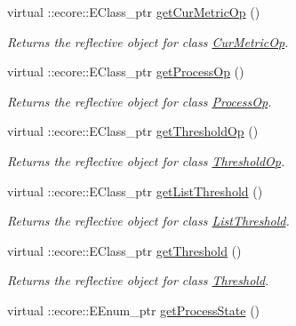 \begin{DoxyCompactItemize}
virtual ::ecore::EClass\_\-ptr \hyperlink{classIMS__Data_1_1IMS__DataPackage_af89695e15fa9f8b666a118d129ec0b7e}{getCurMetricOp} ()
\begin{DoxyCompactList}\small\item\em Returns the reflective object for class \hyperlink{classIMS__Data_1_1CurMetricOp}{CurMetricOp}. \item\end{DoxyCompactList}\item 
virtual ::ecore::EClass\_\-ptr \hyperlink{classIMS__Data_1_1IMS__DataPackage_af66ff319ec0a02a5a7e1c1b18d4a9f8b}{getProcessOp} ()
\begin{DoxyCompactList}\small\item\em Returns the reflective object for class \hyperlink{classIMS__Data_1_1ProcessOp}{ProcessOp}. \item\end{DoxyCompactList}\item 
virtual ::ecore::EClass\_\-ptr \hyperlink{classIMS__Data_1_1IMS__DataPackage_a569cf2cea402678595d96bdb1d66270c}{getThresholdOp} ()
\begin{DoxyCompactList}\small\item\em Returns the reflective object for class \hyperlink{classIMS__Data_1_1ThresholdOp}{ThresholdOp}. \item\end{DoxyCompactList}\item 
virtual ::ecore::EClass\_\-ptr \hyperlink{classIMS__Data_1_1IMS__DataPackage_a73be3b199a1e68564e4706e6ad1d2d10}{getListThreshold} ()
\begin{DoxyCompactList}\small\item\em Returns the reflective object for class \hyperlink{classIMS__Data_1_1ListThreshold}{ListThreshold}. \item\end{DoxyCompactList}\item 
virtual ::ecore::EClass\_\-ptr \hyperlink{classIMS__Data_1_1IMS__DataPackage_adc18e540f0bf017917b5f6b71cea2907}{getThreshold} ()
\begin{DoxyCompactList}\small\item\em Returns the reflective object for class \hyperlink{classIMS__Data_1_1Threshold}{Threshold}. \item\end{DoxyCompactList}\item 
virtual ::ecore::EEnum\_\-ptr \hyperlink{classIMS__Data_1_1IMS__DataPackage_aaa8cb99ceca73f5a445dd4a20190f729}{getProcessState} ()

\end{DoxyCompactItemize}
